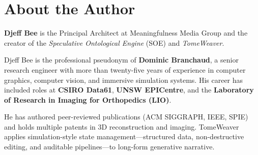 \documentclass[12pt, a4paper]{article}
\begin{document}
\vspace{1cm}
\section*{About the Author}

\textbf{Djeff Bee} is the Principal Architect at Meaningfulness Media Group and the creator of the \textit{Speculative Ontological Engine} (SOE) and \textit{TomeWeaver}.

Djeff Bee is the professional pseudonym of \textbf{Dominic Branchaud}, a senior research engineer with more than twenty-five years of experience in computer graphics, computer vision, and immersive simulation systems. His career has included roles at \textbf{CSIRO Data61}, \textbf{UNSW EPICentre}, and the \textbf{Laboratory of Research in Imaging for Orthopedics (LIO)}.

He has authored peer-reviewed publications (ACM SIGGRAPH, IEEE, SPIE) and holds multiple patents in 3D reconstruction and imaging. TomeWeaver applies simulation-style state management---structured data, non-destructive editing, and auditable pipelines---to long-form generative narrative.

\vspace{2em}
\end{document}
